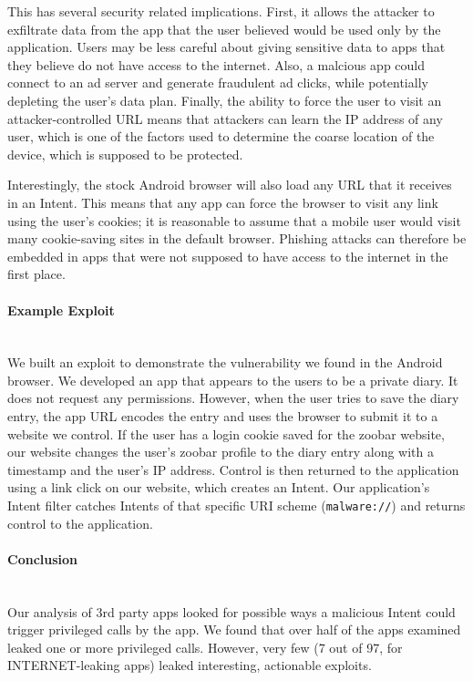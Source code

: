 \documentclass[12pt,a4paper]{article}
\begin{document}
This has several security related implications. First, it allows the attacker to
exfiltrate data from the app that the user believed would be used only by the
application. Users may be less careful about giving sensitive data to apps that
they believe do not have access to the internet.  Also, a malcious app could
connect to an ad server and generate fraudulent ad clicks, while potentially
depleting the user's data plan.  Finally, the ability to force the user to visit
an attacker-controlled URL means that attackers can learn the IP address of any
user, which is one of the factors used to determine the coarse location of the
device, which is supposed to be protected.

Interestingly, the stock Android browser will also load any URL that it receives
in an Intent. This means that any app can force the browser to visit any link
using the user's cookies; it is reasonable to assume that a mobile user would
visit many cookie-saving sites in the default browser. Phishing attacks can
therefore be embedded in apps that were not supposed to have access to the
internet in the first place.

\paragraph{Example Exploit} ~\\
We built an exploit to demonstrate the vulnerability we found in the Android
browser. We developed an app that appears to the users to be a private diary. It
does not request any permissions. However, when the user tries to save the diary
entry, the app URL encodes the entry and uses the browser to submit it to a
website we control. If the user has a login cookie saved for the zoobar website,
our website changes the user's zoobar profile to the diary entry along with a
timestamp and the user's IP address. Control is then returned to the application
using a link click on our website, which creates an Intent. Our application's
Intent filter catches Intents of that specific URI scheme (\texttt{malware://})
and returns control to the application.

\paragraph{Conclusion} ~\\
Our analysis of 3rd party apps looked for possible ways a malicious Intent could
trigger privileged calls by the app. We found that over half of the apps
examined leaked one or more privileged calls. However, very few (7 out of 97,
for INTERNET-leaking apps) leaked interesting, actionable exploits.
\end{document}
